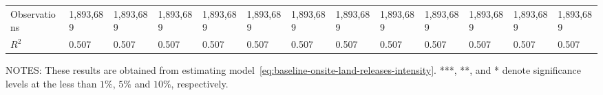 \begin{table}[H]
{\begin{tabular}{@{}lllllllllllll@{}}
            Observations                               & 1,893,689 & 1,893,689 & 1,893,689 & 1,893,689 & 1,893,689 & 1,893,689 & 1,893,689            & 1,893,689            & 1,893,689            & 1,893,689         & 1,893,689         & 1,893,689         \\
            $R^2$                                      & 0.507     & 0.507     & 0.507     & 0.507     & 0.507     & 0.507     & 0.507                & 0.507                & 0.507                & 0.507             & 0.507             & 0.507             \\ \bottomrule\bottomrule
        \end{tabular}%
    }
    \begin{minipage}{\columnwidth}
        \vspace{0.05in}
        \tiny NOTES: These results are obtained from estimating model~\ref{eq:baseline-onsite-land-releases-intensity}. ***, **, and * denote significance levels at the less than $1\%$, $5\%$ and $10\%$, respectively.
    \end{minipage}
\end{table}